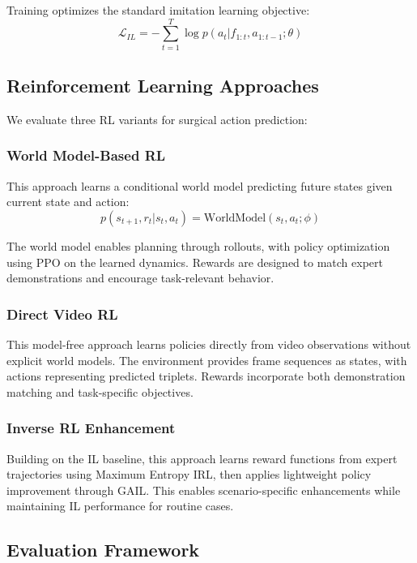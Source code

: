 \documentclass[runningheads]{llncs}
\begin{document}
Training optimizes the standard imitation learning objective:
\begin{equation}
\mathcal{L}_{IL} = -\sum_{t=1}^{T} \log p(a_t|f_{1:t}, a_{1:t-1}; \theta)
\end{equation}

\subsection{Reinforcement Learning Approaches}

We evaluate three RL variants for surgical action prediction:

\subsubsection{World Model-Based RL}
This approach learns a conditional world model predicting future states given current state and action:
\begin{equation}
p(s_{t+1}, r_t|s_t, a_t) = \text{WorldModel}(s_t, a_t; \phi)
\end{equation}

The world model enables planning through rollouts, with policy optimization using PPO on the learned dynamics. Rewards are designed to match expert demonstrations and encourage task-relevant behavior.

\subsubsection{Direct Video RL}
This model-free approach learns policies directly from video observations without explicit world models. The environment provides frame sequences as states, with actions representing predicted triplets. Rewards incorporate both demonstration matching and task-specific objectives.

\subsubsection{Inverse RL Enhancement}
Building on the IL baseline, this approach learns reward functions from expert trajectories using Maximum Entropy IRL, then applies lightweight policy improvement through GAIL. This enables scenario-specific enhancements while maintaining IL performance for routine cases.

\subsection{Evaluation Framework}
\end{document}
